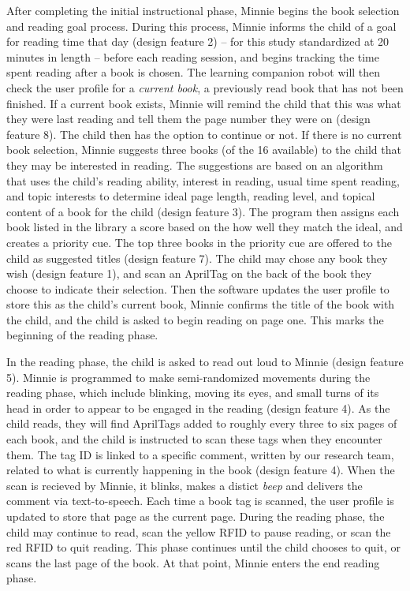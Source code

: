 \documentclass{sigchi}
\begin{document}
After completing the initial instructional phase, Minnie begins the book selection and reading goal process. During this process, Minnie informs the child of a goal for reading time that day (design feature 2) -- for this study standardized at 20 minutes in length -- before each reading session, and begins tracking the time spent reading after a book is chosen. The learning companion robot will then check the user profile for a \textit{current book}, a previously read book that has not been finished. If a current book exists, Minnie will remind the child that this was what they were last reading and tell them the page number they were on (design feature 8). The child then has the option to continue or not. If there is no current book selection, Minnie suggests three books (of the 16 available) to the child that they may be interested in reading. The suggestions are based on an algorithm that uses the child's reading ability, interest in reading, usual time spent reading, and topic interests to determine ideal page length, reading level, and topical content of a book for the child (design feature 3). The program then assigns each book listed in the library a score based on the how well they match the ideal, and creates a priority cue. The top three books in the priority cue are offered to the child as suggested titles (design feature 7). The child may chose any book they wish (design feature 1), and scan an AprilTag on the back of the book they choose to indicate their selection. Then the software updates the user profile to store this as the child's current book, Minnie confirms the title of the book with the child, and the child is asked to begin reading on page one. This marks the beginning of the reading phase.

In the reading phase, the child is asked to read out loud to Minnie (design feature 5). Minnie is programmed to make semi-randomized movements during the reading phase, which include blinking, moving its eyes, and small turns of its head in order to appear to be engaged in the reading (design feature 4). As the child reads, they will find AprilTags added to roughly every three to six pages of each book, and the child is instructed to scan these tags when they encounter them. The tag ID is linked to a specific comment, written by our research team, related to what is currently happening in the book (design feature 4). When the scan is recieved by Minnie, it blinks, makes a distict \textit{beep} and delivers the comment via text-to-speech. Each time a book tag is scanned, the user profile is updated to store that page as the current page. During the reading phase, the child may continue to read, scan the yellow RFID to pause reading, or scan the red RFID to quit reading. This phase continues until the child chooses to quit, or scans the last page of the book. At that point, Minnie enters the end reading phase.
\end{document}

